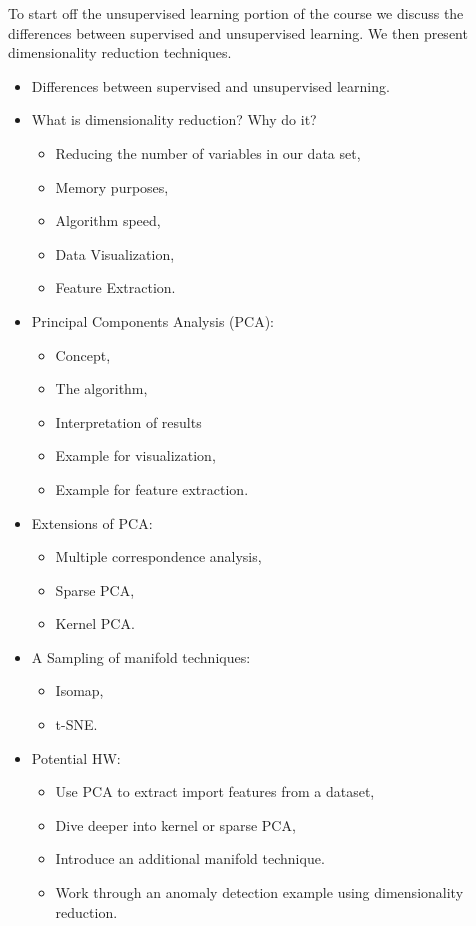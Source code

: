 \documentclass[12pt]{article}
\begin{document}
	\noindent
	To start off the unsupervised learning portion of the course we discuss the differences between supervised and unsupervised learning. We then present dimensionality reduction techniques.
	\begin{itemize}
		\item Differences between supervised and unsupervised learning.
		\item What is dimensionality reduction? Why do it?
			\begin{itemize}
				\item Reducing the number of variables in our data set,
				\item Memory purposes,
				\item Algorithm speed,
				\item Data Visualization,
				\item Feature Extraction.
			\end{itemize}
		\item Principal Components Analysis (PCA):
			\begin{itemize}
				\item Concept,
				\item The algorithm,
				\item Interpretation of results
				\item Example for visualization,
				\item Example for feature extraction.
			\end{itemize}
		\item Extensions of PCA:
			\begin{itemize}
				\item Multiple correspondence analysis,
				\item Sparse PCA,
				\item Kernel PCA.
			\end{itemize}
		\item A Sampling of manifold techniques:
			\begin{itemize}
				\item Isomap,
				\item t-SNE.
			\end{itemize}
		\item Potential HW:
			\begin{itemize}
				\item Use PCA to extract import features from a dataset,
				\item Dive deeper into kernel or sparse PCA,
				\item Introduce an additional manifold technique.
				\item Work through an anomaly detection example using dimensionality reduction.
			\end{itemize}
	\end{itemize}
	
\end{document}
